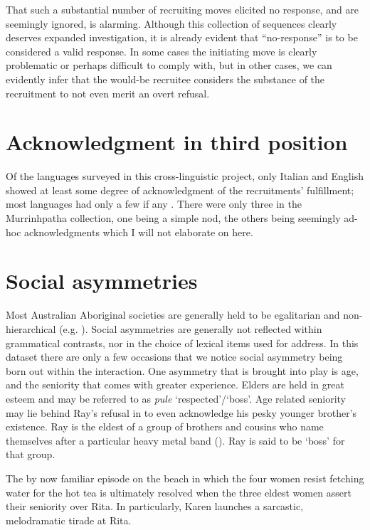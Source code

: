 \documentclass[output=paper,nonflat,colorlinks,citecolor=brown]{langsci/langscibook}
\begin{document}
That such a substantial number of recruiting moves elicited no response, and are seemingly ignored, is alarming. Although this collection of sequences clearly deserves expanded investigation, it is already evident that “no-response” is to be considered a valid response. In some cases the initiating move is clearly problematic or perhaps difficult to comply with, but in other cases, we can evidently infer that the would-be recruitee considers the substance of the recruitment to not even merit an overt refusal.

\section{Acknowledgment in third position}\label{sec:blythe:5}

Of the languages surveyed in this cross-linguistic project, only Italian and English showed at least some degree of acknowledgment of the recruitments’ fulfillment; most languages had only a few if any \citep{FloydEtAl2018}. There were only three in the Murrinhpatha collection, one being a simple nod, the others being seemingly ad-hoc acknowledgments which I will not elaborate on here.

\section{Social asymmetries}\label{sec:blythe:6}

Most Australian Aboriginal societies are generally held to be egalitarian and non-hierarchical (e.g. \citealt{Flanagan1989,Boehm1993,Peterson1993,}). Social asymmetries are generally not reflected within grammatical contrasts, nor in the choice of lexical items used for address. In this dataset there are only a few occasions that we notice social asymmetry being born out within the interaction. One asymmetry that is brought into play is age, and the seniority that comes with greater experience. Elders are held in great esteem and may be referred to as \textit{pule} ‘respected’/‘boss’. Age related seniority may lie behind Ray’s refusal in  to even acknowledge his pesky younger brother’s existence. Ray is the eldest of a group of brothers and cousins who name themselves after a particular heavy metal band (\citealt{Mansfield2013,mansfield_listening_2014a}). Ray is said to be ‘boss’ for that group.

The by now familiar episode on the beach in which the four women resist fetching water for the hot tea is ultimately resolved when the three eldest women assert their seniority over Rita. In  particularly, Karen launches a sarcastic, melodramatic tirade at Rita.
\end{document}
